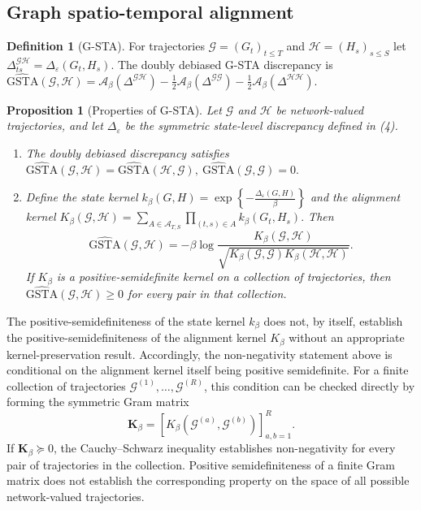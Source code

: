 \documentclass[12pt]{article}
\newtheorem{proposition}{Proposition}
\theoremstyle{definition}
\newtheorem{definition}{Definition}
\begin{document}
\subsection{Graph spatio-temporal alignment}

\begin{definition}[G-STA]\label{def:gsta}
For trajectories $\mathcal G=(G_t)_{t\le T}$ and $\mathcal H=(H_s)_{s\le S}$ let $\Delta^{\mathcal G\mathcal H}_{ts}=\Delta_\varepsilon(G_t,H_s)$. The doubly debiased G-STA discrepancy is
$\widehat{\mathrm{GSTA}}(\mathcal G,\mathcal H)=\mathcal A_\beta(\Delta^{\mathcal G\mathcal H})-\tfrac12\mathcal A_\beta(\Delta^{\mathcal G\mathcal G})-\tfrac12\mathcal A_\beta(\Delta^{\mathcal H\mathcal H})$.
\end{definition}

\begin{proposition}[Properties of G-STA]\label{prop:gsta}
Let $\mathcal G$ and $\mathcal H$ be network-valued
trajectories, and let $\Delta_\varepsilon$ be the
symmetric state-level discrepancy defined in (4).

\begin{enumerate}
\item[(a)]
The doubly debiased discrepancy satisfies
$
\widehat{\mathrm{GSTA}}(\mathcal G,\mathcal H)
=
\widehat{\mathrm{GSTA}}(\mathcal H,\mathcal G),
\
\widehat{\mathrm{GSTA}}(\mathcal G,\mathcal G)=0.
$

\item[(b)]
Define the state kernel
$
k_\beta(G,H)
=
\exp\left\{-\frac{\Delta_\varepsilon(G,H)}
{\beta}\right\}
$
and the alignment kernel
$
K_\beta(\mathcal G,\mathcal H)
=
\sum_{A\in\mathcal A_{T,S}}
\prod_{(t,s)\in A}
k_\beta(G_t,H_s).
$
Then
\[
\widehat{\mathrm{GSTA}}(\mathcal G,\mathcal H)
=
-\beta\log
\frac{K_\beta(\mathcal G,\mathcal H)}
{\sqrt{
K_\beta(\mathcal G,\mathcal G)
K_\beta(\mathcal H,\mathcal H)}}.
\]
If $K_\beta$ is a positive-semidefinite kernel
on a collection of trajectories, then
$
\widehat{\mathrm{GSTA}}(\mathcal G,\mathcal H)
\geq 0
$
for every pair in that collection.
\end{enumerate}
\end{proposition}

The positive-semidefiniteness of the state kernel
$k_\beta$ does not, by itself, establish the
positive-semidefiniteness of the alignment kernel
$K_\beta$ without an appropriate
kernel-preservation result.
Accordingly, the non-negativity statement above
is conditional on the alignment kernel itself
being positive semidefinite.
For a finite collection of trajectories
$\mathcal G^{(1)},\ldots,\mathcal G^{(R)}$,
this condition can be checked directly by
forming the symmetric Gram matrix
\[
\mathbf K_\beta
=
\left[
K_\beta(\mathcal G^{(a)},\mathcal G^{(b)})
\right]_{a,b=1}^{R}.
\]
If $\mathbf K_\beta\succeq0$, the
Cauchy--Schwarz inequality establishes
non-negativity for every pair of trajectories
in the collection.
Positive semidefiniteness of a finite Gram
matrix does not establish the corresponding
property on the space of all possible
network-valued trajectories.
\end{document}
